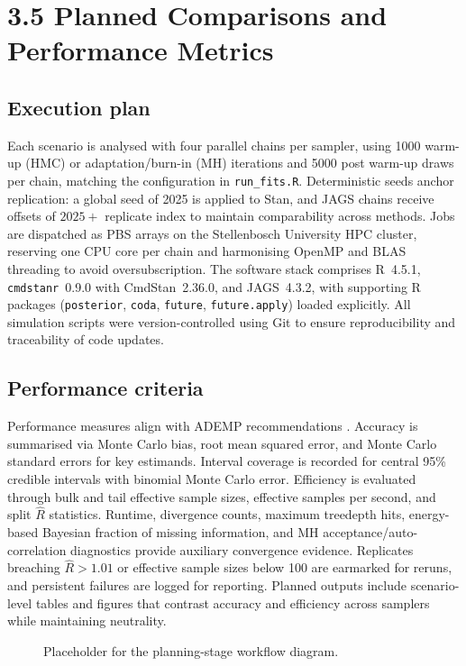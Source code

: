 \section{3.5 Planned Comparisons and Performance Metrics}
\label{sec:performance-plan}
\subsection*{Execution plan}
Each scenario is analysed with four parallel chains per sampler, using 1000 warm-up (HMC) or adaptation/burn-in (MH) iterations and 5000 post warm-up draws per chain, matching the configuration in \texttt{run\_fits.R}. Deterministic seeds anchor replication: a global seed of 2025 is applied to Stan, and JAGS chains receive offsets of $2025 +$ replicate index to maintain comparability across methods. Jobs are dispatched as PBS arrays on the Stellenbosch University HPC cluster, reserving one CPU core per chain and harmonising OpenMP and BLAS threading to avoid oversubscription. The software stack comprises R~4.5.1, \texttt{cmdstanr}~0.9.0 with CmdStan~2.36.0, and JAGS~4.3.2, with supporting R packages (\texttt{posterior}, \texttt{coda}, \texttt{future}, \texttt{future.apply}) loaded explicitly. All simulation scripts were version-controlled using Git to ensure reproducibility and traceability of code updates.

\subsection*{Performance criteria}
Performance measures align with ADEMP recommendations \citep{Morris2019Simulation}. Accuracy is summarised via Monte Carlo bias, root mean squared error, and Monte Carlo standard errors for key estimands. Interval coverage is recorded for central 95\% credible intervals with binomial Monte Carlo error. Efficiency is evaluated through bulk and tail effective sample sizes, effective samples per second, and split $\hat{R}$ statistics. Runtime, divergence counts, maximum treedepth hits, energy-based Bayesian fraction of missing information, and MH acceptance/auto-correlation diagnostics provide auxiliary convergence evidence. Replicates breaching $\hat{R} > 1.01$ or effective sample sizes below 100 are earmarked for reruns, and persistent failures are logged for reporting. Planned outputs include scenario-level tables and figures that contrast accuracy and efficiency across samplers while maintaining neutrality.

\begin{figure}[htbp]
\centering
{}
\caption{Placeholder for the planning-stage workflow diagram.}
\label{fig:basis-workflow}
\end{figure}
